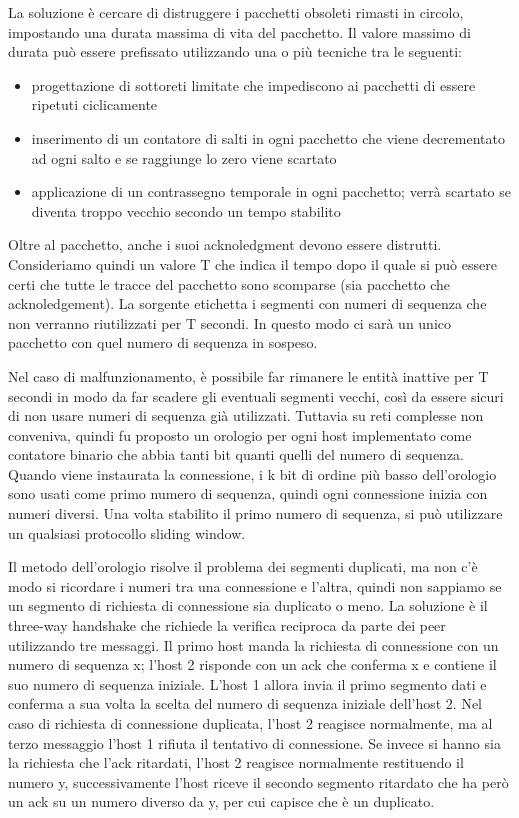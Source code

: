 La soluzione è cercare di distruggere i pacchetti obsoleti rimasti in circolo, impostando una durata massima di vita del pacchetto.
Il valore massimo di durata può essere prefissato utilizzando una o più tecniche tra le seguenti:
\begin{itemize}
\item progettazione di sottoreti limitate che impediscono ai pacchetti di essere ripetuti ciclicamente
\item inserimento di un contatore di salti in ogni pacchetto che viene decrementato ad ogni salto e se raggiunge lo zero viene scartato
\item applicazione di un contrassegno temporale in ogni pacchetto; verrà scartato se diventa troppo vecchio secondo un tempo stabilito
\end{itemize}
Oltre al pacchetto, anche i suoi acknoledgment devono essere distrutti.
Consideriamo quindi un valore T che indica il tempo dopo il quale si può essere certi che tutte le tracce del pacchetto sono scomparse (sia pacchetto che acknoledgement).
La sorgente etichetta i segmenti con numeri di sequenza che non verranno riutilizzati per T secondi.
In questo modo ci sarà un unico pacchetto con quel numero di sequenza in sospeso.

Nel caso di malfunzionamento, è possibile far rimanere le entità inattive per T secondi in modo da far scadere gli eventuali segmenti vecchi, così da essere sicuri di non usare numeri di sequenza già utilizzati.
Tuttavia su reti complesse non conveniva, quindi fu proposto un orologio per ogni host implementato come contatore binario che abbia tanti bit quanti quelli del numero di sequenza.
Quando viene instaurata la connessione, i k bit di ordine più basso dell'orologio sono usati come primo numero di sequenza, quindi ogni connessione inizia con numeri diversi.
Una volta stabilito il primo numero di sequenza, si può utilizzare un qualsiasi protocollo sliding window.

Il metodo dell'orologio risolve il problema dei segmenti duplicati, ma non c'è modo si ricordare i numeri tra una connessione e l'altra, quindi non sappiamo se un segmento di richiesta di connessione sia duplicato o meno.
La soluzione è il three-way handshake che richiede la verifica reciproca da parte dei peer utilizzando tre messaggi.
Il primo host manda la richiesta di connessione con un numero di sequenza x; l'host 2 risponde con un ack che conferma x e contiene il suo numero di sequenza iniziale. L'host 1 allora invia il primo segmento dati e conferma a sua volta la scelta del numero di sequenza iniziale dell'host 2.
Nel caso di richiesta di connessione duplicata, l'host 2 reagisce normalmente, ma al terzo messaggio l'host 1 rifiuta il tentativo di connessione.
Se invece si hanno sia la richiesta che l'ack ritardati, l'host 2 reagisce normalmente restituendo il numero y, successivamente l'host riceve il secondo segmento ritardato che ha però un ack su un numero diverso da y, per cui capisce che è un duplicato.

